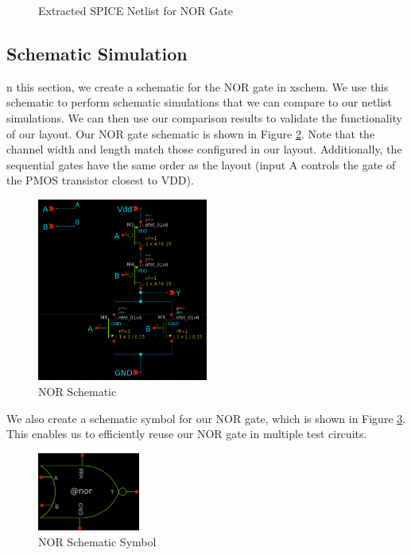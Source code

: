 \documentclass{article}
\begin{document}
	\begin{figure}[H]
		
		\caption{Extracted SPICE Netlist for NOR Gate}
		\label{fig::nor_netlist}
	\end{figure}
	
	\subsection{Schematic Simulation}
	
	n this section, we create a schematic for the NOR gate in xschem. We use this schematic to perform schematic simulations that we can compare to our netlist simulations. We can then use our comparison results to validate the functionality of our layout. Our NOR gate schematic is shown in Figure \ref{fig::nor_schematic}. Note that the channel width and length match those configured in our layout. Additionally, the sequential gates have the same order as the layout (input A controls the gate of the PMOS transistor closest to VDD).
	
	\begin{figure}[H]
		\centerline{\includegraphics[width=0.5\textwidth]{nor_schematic.png}}
		\caption{NOR Schematic}
		\label{fig::nor_schematic}
	\end{figure}
	
	\noindent We also create a schematic symbol for our NOR gate, which is shown in Figure \ref{fig::nor_symbol}. This enables us to efficiently reuse our NOR gate in multiple test circuits.
	
	\begin{figure}[H]
		\centerline{\includegraphics[width=0.3\textwidth]{nor_symbol.png}}
		\caption{NOR Schematic Symbol}
		\label{fig::nor_symbol}
	\end{figure}
	
\end{document}
